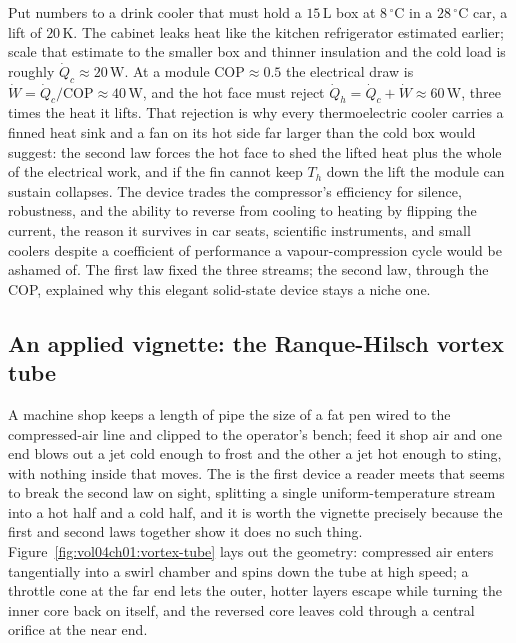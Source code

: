 Put numbers to a drink cooler that must hold a $15\,\text{L}$ box at
$8\,^{\circ}\mathrm{C}$ in a $28\,^{\circ}\mathrm{C}$ car, a lift of
$20\,\si{\kelvin}$. The cabinet leaks heat like the kitchen refrigerator estimated
earlier; scale that estimate to the smaller box and thinner insulation and the
cold load is roughly $\dot Q_c \approx 20\,\text{W}$. At a module
$\text{COP} \approx 0.5$ the electrical draw is $\dot W = \dot Q_c/\text{COP}
\approx 40\,\text{W}$, and the hot face must reject $\dot Q_h = \dot Q_c + \dot W
\approx 60\,\text{W}$, three times the heat it lifts. That rejection is why every
thermoelectric cooler carries a finned heat sink and a fan on its hot side far
larger than the cold box would suggest: the second law forces the hot face to
shed the lifted heat plus the whole of the electrical work, and if the fin cannot
keep $T_h$ down the lift the module can sustain collapses. The device trades the
compressor's efficiency for silence, robustness, and the ability to reverse from
cooling to heating by flipping the current, the reason it survives in car seats,
scientific instruments, and small coolers despite a coefficient of performance a
vapour-compression cycle would be ashamed of. The first law fixed the three
streams; the second law, through the COP, explained why this elegant solid-state
device stays a niche one.

\subsection*{An applied vignette: the Ranque-Hilsch vortex tube}

A machine shop keeps a length of pipe the size of a fat pen wired to the
compressed-air line and clipped to the operator's bench; feed it shop air and one
end blows out a jet cold enough to frost and the other a jet hot enough to sting,
with nothing inside that moves. The  is the first device a
reader meets that seems to break the second law on sight, splitting a single
uniform-temperature stream into a hot half and a cold half, and it is worth the
vignette precisely because the first and second laws together show it does no such
thing. Figure~\ref{fig:vol04ch01:vortex-tube} lays out the geometry: compressed air
enters tangentially into a swirl chamber and spins down the tube at high speed; a
throttle cone at the far end lets the outer, hotter layers escape while turning the
inner core back on itself, and the reversed core leaves cold through a central
orifice at the near end.

